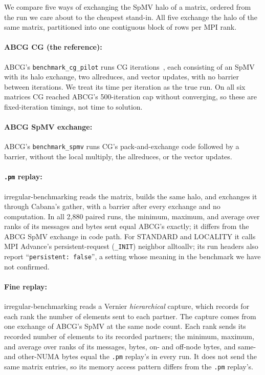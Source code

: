 \documentclass[11pt]{article}
\newcommand{\pmrep}{\texttt{.pm} replay}
\begin{document}
We compare five ways of exchanging the SpMV halo of a matrix, ordered from the run we
care about to the cheapest stand-in. All five exchange the halo of the same matrix,
partitioned into one contiguous block of rows per MPI rank.

\paragraph{ABCG CG (the reference):} ABCG's \texttt{benchmark\_cg\_pilot} runs CG
iterations~\cite{abcg}, each consisting of an SpMV with its halo exchange, two
allreduces, and vector updates, with no barrier between iterations. We treat its time
per iteration as the true run. On all six matrices CG reached ABCG's 500-iteration cap
without converging, so these are fixed-iteration timings, not time to solution.

\paragraph{ABCG SpMV exchange:} ABCG's \texttt{benchmark\_spmv} runs CG's
pack-and-exchange code followed by a barrier, without the local multiply, the
allreduces, or the vector updates.

\paragraph{\pmrep:} irregular-benchmarking reads the matrix, builds the same halo, and
exchanges it through Cabana's gather, with a barrier after every exchange and no
computation. In all 2,880 paired runs, the minimum, maximum, and average over ranks of
its messages and bytes sent equal ABCG's exactly; it differs from the ABCG SpMV exchange
in code path. For STANDARD and LOCALITY it calls MPI Advance's persistent-request
(\texttt{\_INIT}) neighbor alltoallv; its run headers also report
``\texttt{persistent: false}'', a setting whose meaning in the benchmark we have not
confirmed.

\paragraph{Fine replay:} irregular-benchmarking reads a Vernier \emph{hierarchical}
capture, which records for each rank the number of elements sent to each partner. The
capture comes from one exchange of ABCG's SpMV at the same node count. Each rank sends
its recorded number of elements to its recorded partners; the minimum, maximum, and
average over ranks of its messages, bytes, on- and off-node bytes, and same- and
other-NUMA bytes equal the \pmrep's in every run. It does not send the same matrix
entries, so its memory access pattern differs from the \pmrep's.
\end{document}
